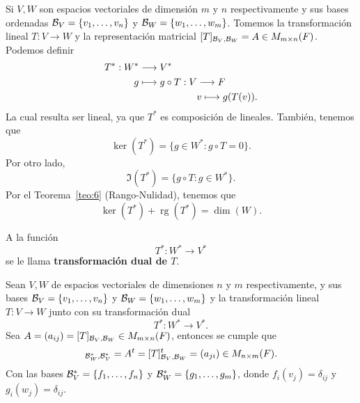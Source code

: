 \documentclass[12pt,a4paper]{book}
\newcommand{\rg}{\operatorname{rg}}
\newcommand{\llaves}[1]{\{#1\}}
\begin{document}
    Si $V, W$ son espacios vectoriales de dimensión $m$ y $n$ respectivamente y sus bases ordenadas $\BB_{V} = \llaves{v_{1}, \dots, v_{n}}$ y $\BB_{W} = \llaves{w_{1}, \dots, w_{m}}$. Tomemos la transformación lineal $T: V \to W$ y la representación matricial $[T]_{\mathcal{B}_{V}, \mathcal{B}_{W}} = A \in M_{m \times n}(F)$. Podemos definir
    \begin{equation*}
        \begin{aligned}
            T^{*}: W^{*} & \longrightarrow V^{*} \\
            g & \longmapsto g \circ T:V\longrightarrow F \\
            &\hspace{2.1cm} v\longmapsto g(T(v)).
        \end{aligned}
    \end{equation*}
    La cual resulta ser lineal, ya que $T^{*}$ es composición de lineales. También, tenemos que
    \begin{equation*}
    \ker(T^{*}) = \llaves{g \in W^{*} : g \circ T = 0}.
    \end{equation*}
    Por otro lado,
    \begin{equation*}
    \Im(T^{*}) = \llaves{g \circ T : g \in W^{*}}.
    \end{equation*}
    Por el Teorema~\ref{teo:6} (Rango-Nulidad), tenemos que
    \begin{equation*}
    \ker(T^{*}) + \rg(T^{*}) = \dim(W).
    \end{equation*}

    \vspace{1.8cm}

    \begin{definicion}
    \label{def:31}
        A la función
        \begin{equation*}
        T^{*}: W^{*}  \longrightarrow V^{*}
        \end{equation*}
        se le llama \textbf{transformación dual de $T$}.
    \end{definicion}

    \begin{teorema}
    \label{teo:11}
        Sean $V, W$ de espacios vectoriales de dimensiones $n$ y $m$ respectivamente, y sus bases $\BB_{V} = \llaves{v_{1}, \dots, v_{n}}$ y $\BB_{W} = \llaves{w_{1}, \dots, w_{m}}$ y la transformación lineal $T: V \to W$ junto con su transformación dual
        \begin{equation*}
        T^{*} : W^{*} \longrightarrow V^{*}.
        \end{equation*}
        Sea $A = (a_{ij}) = [T]_{\mathcal{B}_{V}, \mathcal{B}_{W}} \in M_{m \times n}(F)$, entonces se cumple que
        \begin{equation*}
        [T^{*}]_{\BB_{W}^{*}, \BB_{V}^{*}} = A^{t} = [T]^{t}_{\BB_{V}, \BB_{W}} = (a_{ji}) \in M_{n \times m}(F).
        \end{equation*}
        Con las bases $\BB_{V}^{*} = \llaves{f_{1}, \dots, f_{n}}$ y $\BB_{W}^{*} = \llaves{g_{1}, \dots, g_{m}}$, donde $f_{i}(v_{j}) = \delta_{ij}$ y $g_{i}(w_{j}) = \delta_{ij}$.
    \end{teorema}
    
\end{document}
